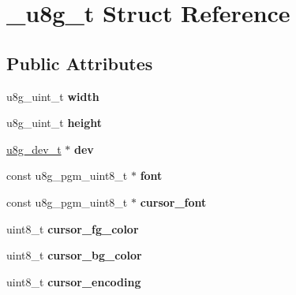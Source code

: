 \hypertarget{struct__u8g__t}{\section{\-\_\-u8g\-\_\-t Struct Reference}
\label{struct__u8g__t}
}
\subsection*{Public Attributes}
\begin{DoxyCompactItemize}
\item 
\hypertarget{struct__u8g__t_a4296196f0c320e146df1f96909f3444d}{u8g\-\_\-uint\-\_\-t {\bfseries width}}\label{struct__u8g__t_a4296196f0c320e146df1f96909f3444d}

\item 
\hypertarget{struct__u8g__t_a00a28f4a60a7460e0d3deca135035bdf}{u8g\-\_\-uint\-\_\-t {\bfseries height}}\label{struct__u8g__t_a00a28f4a60a7460e0d3deca135035bdf}

\item 
\hypertarget{struct__u8g__t_ad163a931af5fa066d7e5e05d7eeffa0d}{\hyperlink{struct__u8g__dev__t}{u8g\-\_\-dev\-\_\-t} $\ast$ {\bfseries dev}}\label{struct__u8g__t_ad163a931af5fa066d7e5e05d7eeffa0d}

\item 
\hypertarget{struct__u8g__t_a689de4f0cd7404e75dde233bca3a76c7}{const u8g\-\_\-pgm\-\_\-uint8\-\_\-t $\ast$ {\bfseries font}}\label{struct__u8g__t_a689de4f0cd7404e75dde233bca3a76c7}

\item 
\hypertarget{struct__u8g__t_a5cf5d98e817d35c1993bd24421d0054a}{const u8g\-\_\-pgm\-\_\-uint8\-\_\-t $\ast$ {\bfseries cursor\-\_\-font}}\label{struct__u8g__t_a5cf5d98e817d35c1993bd24421d0054a}

\item 
\hypertarget{struct__u8g__t_aaa9e211e0c50cf7e01a176a71bb239ff}{uint8\-\_\-t {\bfseries cursor\-\_\-fg\-\_\-color}}\label{struct__u8g__t_aaa9e211e0c50cf7e01a176a71bb239ff}

\item 
\hypertarget{struct__u8g__t_ad612f46b40f905a1baac4829a968026c}{uint8\-\_\-t {\bfseries cursor\-\_\-bg\-\_\-color}}\label{struct__u8g__t_ad612f46b40f905a1baac4829a968026c}

\item 
\hypertarget{struct__u8g__t_acf5fce55e53344d0ff76d62bd8f12683}{uint8\-\_\-t {\bfseries cursor\-\_\-encoding}}\label{struct__u8g__t_acf5fce55e53344d0ff76d62bd8f12683}


\end{DoxyCompactItemize}
